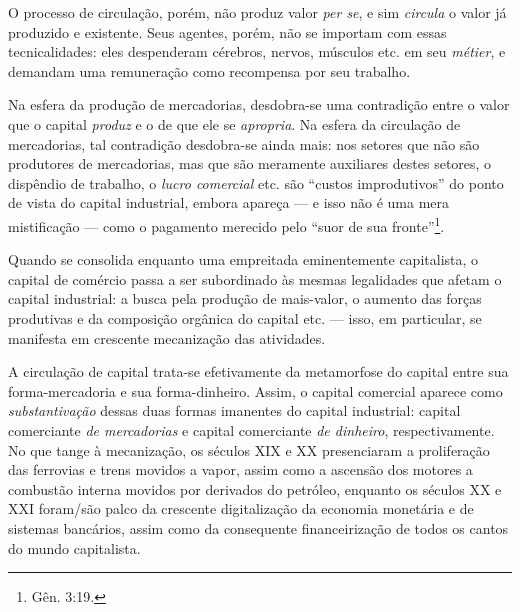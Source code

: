 O processo de circulação, porém, não produz valor \textit{per se}, e sim \textit{circula} o valor já produzido e existente. Seus agentes, porém, não se importam com essas tecnicalidades: eles despenderam cérebros, nervos, músculos etc. em seu \textit{métier}, e demandam uma remuneração como recompensa por seu trabalho. 

Na esfera da produção de mercadorias, desdobra-se uma contradição entre o valor que o capital \textit{produz} e o de que ele se \textit{apropria}. Na esfera da circulação de mercadorias, tal contradição desdobra-se ainda mais: nos setores que não são produtores de mercadorias, mas que são meramente auxiliares destes setores, o dispêndio de trabalho, o \textit{lucro comercial} etc. são ``custos improdutivos'' do ponto de vista do capital industrial, embora apareça --- e isso não é uma mera mistificação --- como o pagamento merecido pelo ``suor de sua fronte''\footnote{Gên. 3:19.}. 

Quando se consolida enquanto uma empreitada eminentemente capitalista, o capital de comércio passa a ser subordinado às mesmas legalidades que afetam o capital industrial: a busca pela produção de mais-valor, o aumento das forças produtivas e da composição orgânica do capital etc. --- isso, em particular, se manifesta em crescente mecanização das atividades. 

A circulação de capital trata-se efetivamente da metamorfose do capital entre sua forma-mercadoria e sua forma-dinheiro. Assim, o capital comercial aparece como \textit{substantivação} dessas duas formas imanentes do capital industrial: capital comerciante \textit{de mercadorias} e capital comerciante \textit{de dinheiro}, respectivamente. No que tange à mecanização, os séculos XIX e XX presenciaram a proliferação das ferrovias e trens movidos a vapor, assim como a ascensão dos motores a combustão interna movidos por derivados do petróleo, enquanto os séculos XX e XXI foram/são palco da crescente digitalização da economia monetária e de sistemas bancários, assim como da consequente financeirização de todos os cantos do mundo capitalista. 




